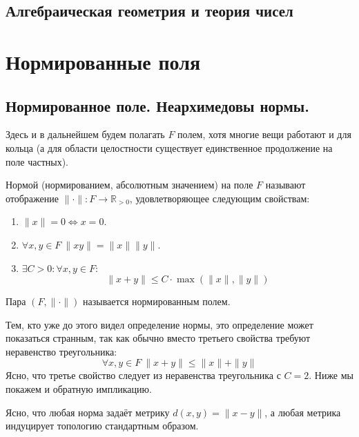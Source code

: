 \documentclass[11pt]{article}
\begin{document}
    
    \begin{center}
        \section*{Алгебраическая геометрия и теория чисел}
    \end{center}
    \tableofcontents
    \newpage

    \section{Нормированные поля}
    \subsection{Нормированное поле. Неархимедовы нормы.}
    Здесь и в дальнейшем будем полагать $F$ полем, хотя многие вещи работают и для кольца (а для области целостности существует
    единственное продолжение на поле частных).

    \begin{definition}\label{fieldnorm}
     Нормой (нормированием, абсолютным значением) на поле $F$  называют отображение $\| \cdot \|\colon F \to \mathbb{R}_{> 0}$,
        удовлетворяющее следующим свойствам:
        \begin{enumerate}
            \item $\| x \| = 0 \Leftrightarrow x = 0$.

            \item $\forall x, y \in F \ \| x y \| = \| x \| \| y \| $.

            \item $\exists C > 0\colon \forall x, y \in F\colon$
            \[ \| x + y \| \le C \cdot \max(\| x \|, \| y \| ) \]
        \end{enumerate}
        Пара $(F, \| \cdot \|)$ называется нормированным полем.
    \end{definition}
    \begin{remark}
        Тем, кто уже до этого видел определение нормы, это определение может показаться странным, так как обычно вместо третьего свойства
        требуют неравенство треугольника:
        \[ \forall x, y \in F \ \| x + y \| \le \| x \| + \| y \| \]
        Ясно, что третье свойство следует из неравенства треугольника с $C = 2$. Ниже мы покажем и обратную импликацию.
    \end{remark}

    Ясно, что любая норма задаёт метрику $d(x, y) = \| x - y \|$, а любая метрика индуцирует топологию стандартным образом.
\end{document}
